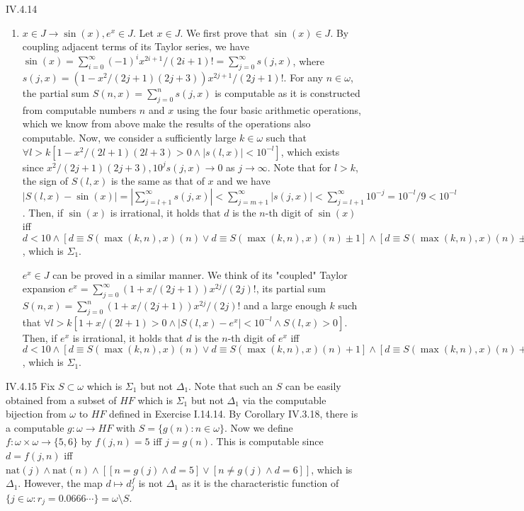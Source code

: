 \documentclass[12pt]{article}
\begin{document}
\begin{customthm}{IV.4.14}
\begin{enumerate}
    \item\underline{$x\in J\rightarrow\sin(x),e^x\in J$}. Let $x\in J$. We first prove that $\sin(x)\in J$. By coupling adjacent terms of its Taylor series, we have $\sin(x)=\sum_{i=0}^\infty(-1)^ix^{2i+1}/(2i+1)!=\sum_{j=0}^\infty s(j,x)$, where $s(j,x)=(1-x^2/(2j+1)(2j+3))x^{2j+1}/(2j+1)!$. For any $n\in\omega$, the partial sum $S(n,x)=\sum_{j=0}^n s(j,x)$ is computable as it is constructed from computable numbers $n$ and $x$ using the four basic arithmetic operations, which we know from above make the results of the operations also computable. Now, we consider a sufficiently large $k\in\omega$ such that $\forall l>k[1-x^2/(2l+1)(2l+3)>0\wedge|s(l,x)|<10^{-l}]$, which exists since $x^2/(2j+1)(2j+3),10^js(j,x)\rightarrow0$ as $j\rightarrow\infty$. Note that for $l>k$, the sign of $S(l,x)$ is the same as that of $x$ and we have $|S(l,x)-\sin(x)|=|\sum_{j=l+1}^\infty s(j,x)|<\sum_{j=m+1}^\infty|s(j,x)|<\sum_{j=l+1}^\infty10^{-j}=10^{-l}/9<10^{-l}$. Then, if $\sin(x)$ is irrational, it holds that $d$ is the $n$-th digit of $\sin(x)$ iff $d<10\wedge[d\equiv S(\max(k,n),x)(n)\vee d\equiv S(\max(k,n),x)(n)\pm1]\wedge[d\equiv S(\max(k,n),x)(n)\pm1\rightarrow\exists m[m>\max(k,n)\wedge d\equiv S(m,x)(n)]]$, which is $\Sigma_1$.

    $e^x\in J$ can be proved in a similar manner. We think of its "coupled" Taylor expansion $e^x=\sum_{j=0}^\infty(1+x/(2j+1))x^{2j}/(2j)!$, its partial sum $S(n,x)=\sum_{j=0}^n(1+x/(2j+1))x^{2j}/(2j)!$ and a large enough $k$ such that $\forall l>k[1+x/(2l+1)>0\wedge|S(l,x)-e^x|<10^{-l}\wedge S(l,x)>0]$. Then, if $e^x$ is irrational, it holds that $d$ is the $n$-th digit of $e^x$ iff $d<10\wedge[d\equiv S(\max(k,n),x)(n)\vee d\equiv S(\max(k,n),x)(n)+1]\wedge[d\equiv S(\max(k,n),x)(n)+1\rightarrow\exists m[m>\max(k,n)\wedge d\equiv S(m,x)(n)]]$, which is $\Sigma_1$.
   \end{enumerate}
\end{customthm}

\begin{customthm}{IV.4.15}
  Fix $S\subset\omega$ which is $\Sigma_1$ but not $\Delta_1$. Note that such an $S$ can be easily obtained from a subset of $HF$ which is $\Sigma_1$ but not $\Delta_1$ via the computable bijection from $\omega$ to $HF$ defined in Exercise I.14.14. By Corollary IV.3.18, there is a computable $g:\omega\rightarrow HF$ with $S=\{g(n):n\in\omega\}$. Now we define $f:\omega\times\omega\rightarrow\{5,6\}$ by $f(j,n)=5$ iff $j=g(n)$. This is computable since $d=f(j,n)$ iff $\mathrm{nat}(j)\wedge\mathrm{nat}(n)\wedge[[n=g(j)\wedge d=5]\vee[n\neq g(j)\wedge d=6]]$, which is $\Delta_1$. However, the map $d\mapsto d_j^f$ is not $\Delta_1$ as it is the characteristic function of $\{j\in\omega:r_j=0.0666\cdots\}=\omega\setminus S$.
\end{customthm}
\end{document}
